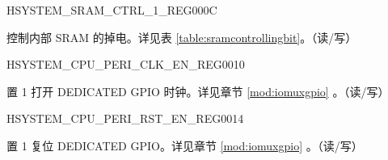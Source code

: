\begin{register}{H}{SYSTEM\_SRAM\_CTRL\_1\_REG}{\hexprefix{}000C}\label{regdesc:SYSTEMSRAMCTRL1REG}
%
%
\regnewline%
\begin{regdesc}\begin{reglist}
\label{fielddesc:SYSTEMSRAMFORCEPD}\item [SYSTEM\_SRAM\_FORCE\_PD] 控制内部 SRAM 的掉电。详见表 \ref{table:sramcontrollingbit}。（读/写）

\end{reglist}\end{regdesc}
\end{register}



\begin{register}{H}{SYSTEM\_CPU\_PERI\_CLK\_EN\_REG}{\hexprefix{}0010}\label{regdesc:SYSTEMCPUPERICLKENREG}
%
%
%
%
\regnewline%
\begin{regdesc}\begin{reglist}
\label{fielddesc:SYSTEMCLKENDEDICATEDGPIO}\item [SYSTEM\_CLK\_EN\_DEDICATED\_GPIO] 置 1 打开 DEDICATED GPIO 时钟。详见章节 \ref{mod:iomuxgpio} \textit{}。（读/写）
\end{reglist}\end{regdesc}
\end{register}


\begin{register}{H}{SYSTEM\_CPU\_PERI\_RST\_EN\_REG}{\hexprefix{}0014}\label{regdesc:SYSTEMCPUPERIRSTENREG}
%
%
%
%
\regnewline%
\begin{regdesc}\begin{reglist}
\label{fielddesc:SYSTEMRSTENDEDICATEDGPIO}\item [SYSTEM\_RST\_EN\_DEDICATED\_GPIO] 置 1 复位 DEDICATED GPIO。详见章节 \ref{mod:iomuxgpio} \textit{}。（读/写）
\end{reglist}\end{regdesc}
\end{register}


